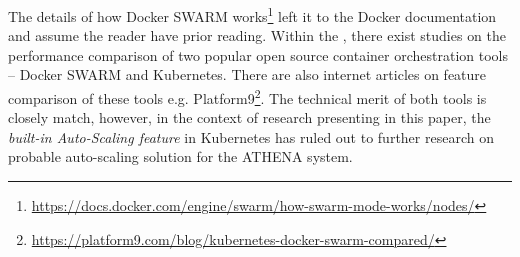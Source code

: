 The details of how Docker SWARM works\footnote{\url{https://docs.docker.com/engine/swarm/how-swarm-mode-works/nodes/}} left it to the Docker documentation and assume the reader have prior reading. Within the \textit{\groupname}, there exist studies \parencite{swarmKubeBench}  on the performance comparison of two popular open source container orchestration tools -- Docker SWARM and Kubernetes. There are also  internet articles on feature comparison of these tools e.g. Platform9\footnote{\url{https://platform9.com/blog/kubernetes-docker-swarm-compared/}}. The technical merit of both tools is closely match, however, in the context of research presenting in this paper, the \emph{built-in Auto-Scaling feature} in Kubernetes has ruled out to further research on probable auto-scaling solution for the ATHENA system.



